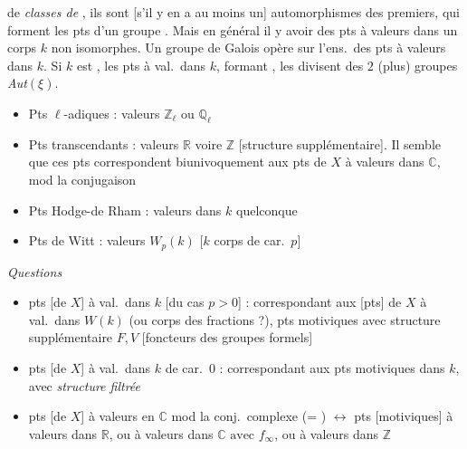 \documentclass[11pt,a4paper]{article}
\begin{document}
\ill{} de \emph{classes de \ill{}}, ils sont [s'il y en a au moins un]
 \ill{} automorphismes des premiers, qui forment
les pts d'un groupe . Mais en général il
 y avoir \ill{} des pts à valeurs dans un corps $k$ non
isomorphes. Un groupe de Galois opère \struck{\ill{}} sur l'ens.\ des pts à
valeurs dans $k$. Si $k$ est \ill{}, les pts à val.\ dans $k$, formant
\ill{}, \ill{} les \ill{} divisent \ill{} des \ill{} \ill{} $2$ (plus)
groupes \ill{} \emph{Aut}$(\xi)$.

\begin{itemize}
  \item Pts $\ell$-adiques : valeurs $\mathbb{Z}_\ell$ ou $\mathbb{Q}_\ell$
  \struck{\ill{}}
  \item Pts transcendants : valeurs $\mathbb{R}$ 
  voire $\mathbb{Z}$ [structure supplémentaire]. Il semble que ces pts
  correspondent biunivoquement aux pts de $X$ à valeurs dans $\mathbb{C}$,
  mod la conjugaison
  \item Pts Hodge-de Rham : valeurs dans $k$ quelconque
  \item Pts de Witt : valeurs $W_p(k)$ [$k$ corps de car.\ $p$]
\end{itemize}

\emph{Questions}
\begin{itemize}
  \item pts [de $X$] à val.\ dans $k$ [du cas $p > 0$] : correspondant aux
  [pts] de $X$ à val.\ dans $W(k)$ (ou corps des fractions ?), pts
  motiviques avec structure supplémentaire
  $\boxed{F, V}$ [foncteurs des groupes formels]
  \item pts [de $X$] à val.\ dans $k$ de car.\ $0$ : correspondant aux pts
  motiviques dans $k$, avec \emph{structure filtrée}
  \item pts [de $X$] à valeurs en $\mathbb{C}$ mod la conj.\ complexe (=
  ) $\longleftrightarrow$ pts [motiviques] à valeurs dans
  $\boxed{\mathbb{R}}$, ou à valeurs dans $\boxed{\mathbb{C} \text{ avec } f_\infty}$,
  ou à valeurs dans $\mathbb{Z}$
\end{itemize}
\end{document}
